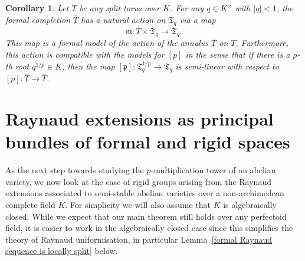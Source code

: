 \documentclass[10pt,oneside]{amsart}
\newtheorem{corollary}[theorem]{Corollary}
\theoremstyle{definition}
\theoremstyle{remark}
\begin{document}
	\begin{corollary}\label{action on formal model of torus}
		Let $T$ be any split torus over $K$. For any $q\in K^\times$ with $|q|<1$, the formal completion $\overline{T}$ has a natural action on $\mathfrak T_q$ via a map
		\[\mathfrak m:\overline{T}\times \mathfrak T_q\rightarrow \mathfrak T_q.\]
		This map is a formal model of the action of the annulus $\overline{T}$ on $T$. Furthermore, this action is compatible with the models for $[p]$ in the sense that if there is a $p$-th root $q^{1/p}\in K$, then the map $[\mathfrak p]:\mathfrak T_q^{1/p}\rightarrow \mathfrak T_q$ is semi-linear with respect to $[p]:\overline{T}\rightarrow \overline{T}$.
	\end{corollary} 
	
	\section{Raynaud extensions as principal bundles of formal and rigid spaces}\label{Raynaud extensions as principal bundles of formal and rigid spaces}
	As the next step towards studying the $p$-multiplication tower of an abelian variety, we now look at the case of rigid groups arising from the Raynaud extensions associated to semi-stable abelian varieties over a non-archimedean complete field $K$. For simplicity we will also assume that $K$ is algebraically closed.
	While we expect that our main theorem still holds over any perfectoid field, it is easier to work in the algebraically closed case since this simplifies the theory of Raynaud uniformisation, in particular Lemma~\ref{formal Raynaud sequence is locally split} below.
	
\end{document}
